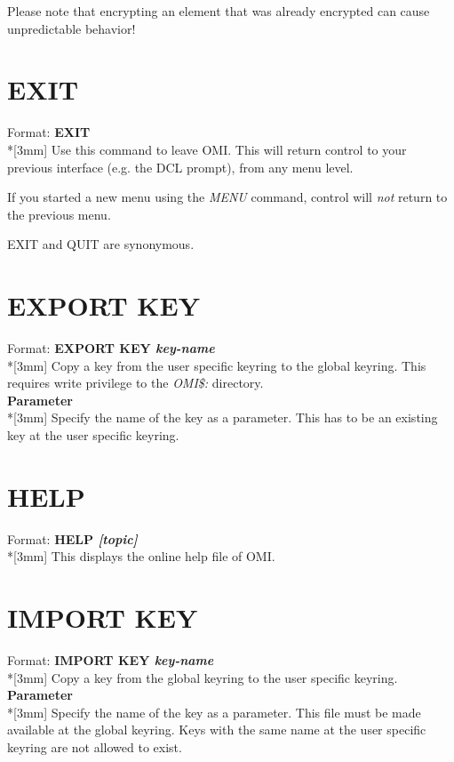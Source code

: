 \documentclass[a4paper]{book}
\newcommand{\vs}{\vspace{3mm}}
\renewcommand{\indent}{\hspace*{5mm}}
\begin{document}
\vs

Please note that encrypting an element that was already encrypted can cause 
unpredictable behavior!

\section{EXIT}
\label{subsec:mylabel14}

\indent Format: \textbf{EXIT}\dag\\*[3mm]
Use this command to leave OMI. This will return control to your previous 
interface (e.g. the DCL prompt), from any menu level.

If you started a new menu using the \textsl{MENU} command, control will \textit{not} return to 
the previous menu.

\vs

\textsf{EXIT} and \textsf{QUIT} are 
synonymous.

\section{EXPORT KEY}
\label{subsec:export}

\indent Format: \textbf{EXPORT KEY \textit{key-name}}\\*[3mm]
Copy a key from the user specific keyring to the global keyring. This 
requires write privilege to the \textsl{OMI{\$}:} directory.\\[3mm]
\textbf{Parameter}\\*[3mm]
Specify the name of the key as a parameter. This has to be an existing key 
at the user specific keyring.

\section{HELP}
\label{subsec:mylabel15}

\indent Format: \textbf{HELP \textit{[topic]}}\\*[3mm]
This displays the online help file of OMI.

\section{IMPORT KEY}
\label{subsec:import}

\indent Format: \textbf{IMPORT KEY \textit{key-name}}\\*[3mm]
Copy a key from the global keyring to the user specific keyring.\\[3mm]
\textbf{Parameter}\\*[3mm]
Specify the name of the key as a parameter. This file must be made available 
at the global keyring. Keys with the same name at the user specific keyring 
are not allowed to exist.
\end{document}
